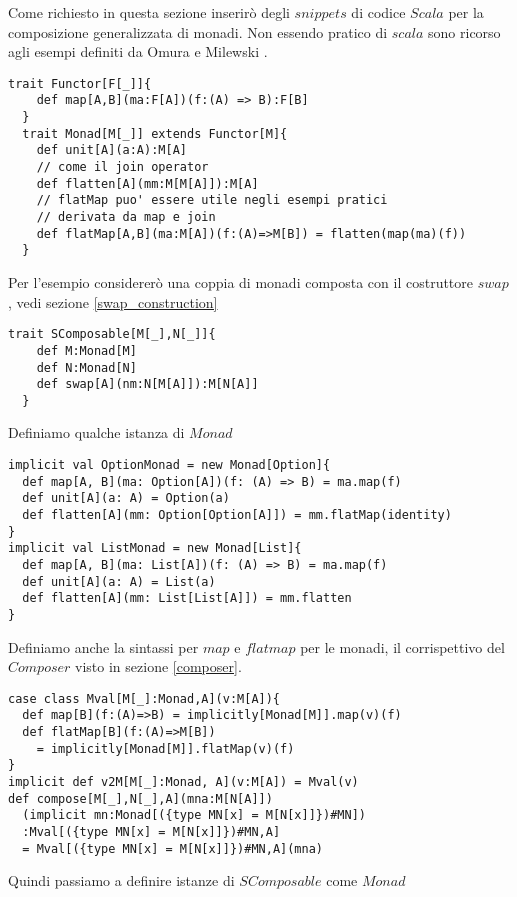 \label{scala_code}
Come richiesto in questa sezione inserirò degli $snippets$ di codice $Scala$
per la composizione generalizzata di monadi.
Non essendo pratico di $scala$ sono ricorso agli esempi definiti da Omura \cite{omura0}
e Milewski \cite{milewski0}.

\begin{lstlisting}[style=myScalastyle, caption=Functor and Monad Traits]
  trait Functor[F[_]]{
    def map[A,B](ma:F[A])(f:(A) => B):F[B]
  }
  trait Monad[M[_]] extends Functor[M]{
    def unit[A](a:A):M[A]
    // come il join operator
    def flatten[A](mm:M[M[A]]):M[A]
    // flatMap puo' essere utile negli esempi pratici
    // derivata da map e join
    def flatMap[A,B](ma:M[A])(f:(A)=>M[B]) = flatten(map(ma)(f))
  }
\end{lstlisting}

Per l'esempio considererò una coppia di monadi composta con il costruttore $swap$,
vedi sezione \ref{swap_construction}

\begin{lstlisting}[style=myScalastyle, caption=Swap Constructor]
  trait SComposable[M[_],N[_]]{
    def M:Monad[M]
    def N:Monad[N]
    def swap[A](nm:N[M[A]]):M[N[A]]
  }
\end{lstlisting}

Definiamo qualche istanza di $Monad$

\begin{lstlisting}[style=myScalastyle, caption=Type class instances]
implicit val OptionMonad = new Monad[Option]{
  def map[A, B](ma: Option[A])(f: (A) => B) = ma.map(f)
  def unit[A](a: A) = Option(a)
  def flatten[A](mm: Option[Option[A]]) = mm.flatMap(identity)
}
implicit val ListMonad = new Monad[List]{
  def map[A, B](ma: List[A])(f: (A) => B) = ma.map(f)
  def unit[A](a: A) = List(a)
  def flatten[A](mm: List[List[A]]) = mm.flatten
}
\end{lstlisting}
\pagebreak
Definiamo anche la sintassi per $map$ e $flatmap$ per le monadi, il corrispettivo
del $Composer$ visto in sezione \ref{composer}.
\begin{lstlisting}[style=myScalastyle, caption=Composer]
case class Mval[M[_]:Monad,A](v:M[A]){
  def map[B](f:(A)=>B) = implicitly[Monad[M]].map(v)(f)
  def flatMap[B](f:(A)=>M[B])
    = implicitly[Monad[M]].flatMap(v)(f)
}
implicit def v2M[M[_]:Monad, A](v:M[A]) = Mval(v)
def compose[M[_],N[_],A](mna:M[N[A]])
  (implicit mn:Monad[({type MN[x] = M[N[x]]})#MN])
  :Mval[({type MN[x] = M[N[x]]})#MN,A]
  = Mval[({type MN[x] = M[N[x]]})#MN,A](mna)
\end{lstlisting}
Quindi passiamo a definire istanze di $SComposable$ come $Monad$

